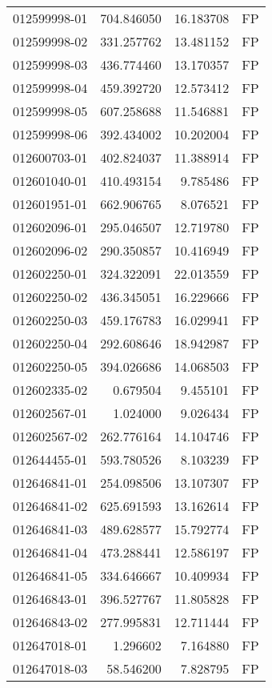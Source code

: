 \begin{tabular}{lrrl}
012599998-01 &  704.846050 &    16.183708 &   FP \\
012599998-02 &  331.257762 &    13.481152 &   FP \\
012599998-03 &  436.774460 &    13.170357 &   FP \\
012599998-04 &  459.392720 &    12.573412 &   FP \\
012599998-05 &  607.258688 &    11.546881 &   FP \\
012599998-06 &  392.434002 &    10.202004 &   FP \\
012600703-01 &  402.824037 &    11.388914 &   FP \\
012601040-01 &  410.493154 &     9.785486 &   FP \\
012601951-01 &  662.906765 &     8.076521 &   FP \\
012602096-01 &  295.046507 &    12.719780 &   FP \\
012602096-02 &  290.350857 &    10.416949 &   FP \\
012602250-01 &  324.322091 &    22.013559 &   FP \\
012602250-02 &  436.345051 &    16.229666 &   FP \\
012602250-03 &  459.176783 &    16.029941 &   FP \\
012602250-04 &  292.608646 &    18.942987 &   FP \\
012602250-05 &  394.026686 &    14.068503 &   FP \\
012602335-02 &    0.679504 &     9.455101 &   FP \\
012602567-01 &    1.024000 &     9.026434 &   FP \\
012602567-02 &  262.776164 &    14.104746 &   FP \\
012644455-01 &  593.780526 &     8.103239 &   FP \\
012646841-01 &  254.098506 &    13.107307 &   FP \\
012646841-02 &  625.691593 &    13.162614 &   FP \\
012646841-03 &  489.628577 &    15.792774 &   FP \\
012646841-04 &  473.288441 &    12.586197 &   FP \\
012646841-05 &  334.646667 &    10.409934 &   FP \\
012646843-01 &  396.527767 &    11.805828 &   FP \\
012646843-02 &  277.995831 &    12.711444 &   FP \\
012647018-01 &    1.296602 &     7.164880 &   FP \\
012647018-03 &   58.546200 &     7.828795 &   FP \\

\end{tabular}
